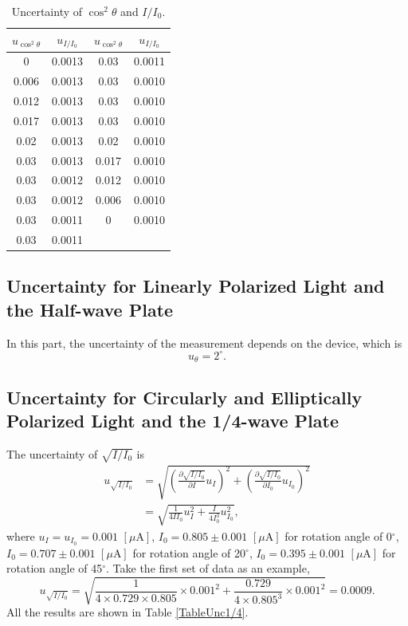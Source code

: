 \documentclass{article}
\begin{document}
\begin{table}[H]\centering
\begin{tabular}{cc||cc}
\toprule
$u_{\cos^2\theta}$ & $u_{I/I_0}$ & $u_{\cos^2\theta}$ & $u_{I/I_0}$\\
\midrule
    0     & 0.0013 & 0.03  & 0.0011 \\
    0.006 & 0.0013 & 0.03  & 0.0010 \\
    0.012 & 0.0013 & 0.03  & 0.0010 \\
    0.017 & 0.0013 & 0.03  & 0.0010 \\
    0.02  & 0.0013 & 0.02  & 0.0010 \\
    0.03  & 0.0013 & 0.017 & 0.0010 \\
    0.03  & 0.0012 & 0.012 & 0.0010 \\
    0.03  & 0.0012 & 0.006 & 0.0010 \\
    0.03  & 0.0011 & 0     & 0.0010 \\
    0.03  & 0.0011 &       &  \\
\bottomrule
\end{tabular}
\caption{Uncertainty of $\cos^2\theta$ and $I/I_0$.}\label{TableUncCI}
\end{table}

\subsection{Uncertainty for Linearly Polarized Light and the Half-wave Plate}

In this part, the uncertainty of the measurement depends on the device, which is 
$$u_\theta = 2^\circ.$$

\subsection{Uncertainty for Circularly and Elliptically Polarized Light and the 1/4-wave Plate}

The uncertainty of $\sqrt{I/I_0}$ is
\begin{align*}
u_{\sqrt{I/I_{0}}}&=\sqrt{(\frac{\partial\sqrt{I/I_0}}{\partial I}u_{I})^{2}+(\frac{\partial\sqrt{I/I_0}}{\partial I_{0}}u_{I_{0}})^{2}}\\
&=\sqrt{\frac{1}{4II_0}u_I^2+\frac{I}{4I_0^3}u_{I_0}^2},
\end{align*}
where $u_I = u_{I_0} = 0.001\,\,[\mu\text{A}]$, $I_0 = 0.805 \pm 0.001\,\,[\mu\text{A}]$ for rotation angle of 0$^\circ$, $I_0 = 0.707 \pm 0.001\,\,[\mu\text{A}]$ for rotation angle of 20$^\circ$, $I_0 = 0.395 \pm 0.001\,\,[\mu\text{A}]$ for rotation angle of 45$^\circ$. Take the first set of data as an example,
$$u_{\sqrt{I/I_{0}}}=\sqrt{\frac{1}{4\times 0.729 \times 0.805} \times 0.001^2+\frac{0.729}{4\times 0.805^3}\times 0.001^2}=0.0009.$$
All the results are shown in Table \ref{TableUnc1/4}.
\end{document}
